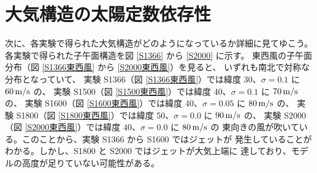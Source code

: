 \documentclass[body]{subfiles}
\begin{document}
\afterpage{\clearpage}

\section{大気構造の太陽定数依存性}

次に、各実験で得られた大気構造がどのようになっているか詳細に見てゆこう。
各実験で得られた子午面構造を図 \ref{S1366} から \ref{S2000} に示す。
東西風の子午面分布（図 \ref{S1366東西風} から \ref{S2000東西風}）を見ると、
いずれも南北で対称な分布となっていて、
実験 S1366（図 \ref{S1366東西風}）では緯度 30\textdegree 、\(\sigma=0.1\) に \(60\hmu{m/s}\) の、
実験 S1500（図 \ref{S1500東西風}）では緯度 40\textdegree 、\(\sigma=0.1\) に \(70\hmu{m/s}\) の、
実験 S1600（図 \ref{S1600東西風}）では緯度 40\textdegree 、\(\sigma=0.05\) に \(80\hmu{m/s}\) の、
実験 S1800（図 \ref{S1800東西風}）では緯度 50\textdegree 、\(\sigma=0.0\) に \(90\hmu{m/s}\) の、
実験 S2000（図 \ref{S2000東西風}）では緯度 40\textdegree 、\(\sigma=0.0\) に \(80\hmu{m/s}\) の
東向きの風が吹いている。このことから、実験 S1366 から S1600 ではジェットが
発生していることがわかる。しかし、S1800 と S2000 ではジェットが大気上端に
達しており、モデルの高度が足りていない可能性がある。
\end{document}
